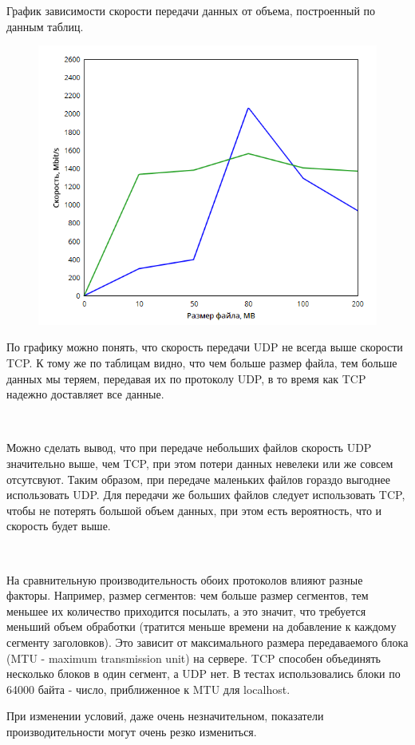 \documentclass{article}
\begin{document}
\newpage

График зависимости скорости передачи данных от объема, построенный по данным таблиц.

\begin{figure}[h]
\includegraphics[scale=0.7]{6}
\end{figure}

По графику можно понять, что скорость передачи UDP не всегда выше скорости TCP.
К тому же по таблицам видно, что чем больше размер файла, тем больше данных мы теряем, передавая их по протоколу UDP, в то время как TCP надежно доставляет все данные.

~\

Можно сделать вывод, что при передаче небольших файлов скорость UDP значительно выше, чем TCP, при этом потери данных невелеки или же совсем отсутсвуют. Таким образом, при передаче маленьких файлов гораздо выгоднее использовать UDP.
Для передачи же больших файлов следует использовать TCP, чтобы не потерять большой объем данных, при этом есть вероятность, что и скорость будет выше.

~\

На сравнительную производительность обо­их протоколов влияют разные факторы. Например, размер сегментов: чем больше размер сегментов, тем меньшее их количество приходится посылать, а это значит, что требуется меньший объем обработки (тратится меньше времени на добавление к каждому сегменту заголовков). Это зависит от максимального размера передаваемого блока (MTU - maximum transmission unit) на сервере. TCP способен объединять несколько блоков в один сегмент, а UDP нет.
В тестах использовались блоки по 64000 байта - число, приближенное к MTU для localhost.

При изменении условий, даже очень незначительном, показатели производительности могут очень резко измениться.
\end{document}

